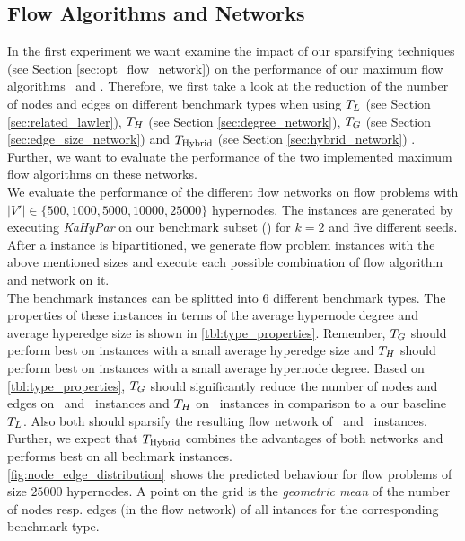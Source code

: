 \subsection{Flow Algorithms and Networks}
\label{sec:exp_flow_network}

In the first experiment we want examine the impact of our sparsifying techniques (see Section \ref{sec:opt_flow_network})
on the performance of our maximum flow algorithms \GoldbergTarjan~and \EdmondKarp. 
Therefore, we first take a look at the reduction of the number of nodes and edges on different benchmark types
when using $T_L$ (see Section \ref{sec:related_lawler}), $T_H$ (see Section 
\ref{sec:degree_network}), $T_G$ (see Section \ref{sec:edge_size_network})
and $T_{\text{Hybrid}}$ (see Section \ref{sec:hybrid_network}) . Further, we
want to evaluate the performance of the two implemented maximum flow algorithms on these
networks. \\
We evaluate the performance of the different flow networks on flow problems with
$|V'| \in \{500,1000,5000,10000,25000\}$ hypernodes. The instances are generated by executing
\emph{KaHyPar} on our benchmark subset () for $k = 2$ and five different 
seeds. After a instance is bipartitioned, we generate flow problem instances
with the above mentioned sizes and execute each possible combination of flow algorithm and
network on it. \\
The benchmark instances can be splitted into $6$ different benchmark types. The properties of these instances
in terms of the average hypernode degree and average hyperedge size is shown in \autoref{tbl:type_properties}.
Remember, $T_G$ should perform best on instances with a small average hyperedge size and
$T_H$ should perform best on instances with a small average hypernode degree. Based on 
\autoref{tbl:type_properties}, $T_G$ should significantly reduce the number of
nodes and edges on \Primal~and \Literal~instances and $T_H$ on \Dual~instances in
comparison to a our baseline $T_L$. Also both should sparsify the resulting flow network
of \ISPD~and \DAC~instances. Further, we expect that $T_{\text{Hybrid}}$ combines the advantages of
both networks and performs best on all bechmark instances.\\
\autoref{fig:node_edge_distribution}~shows the predicted behaviour for flow problems of size
$25000$ hypernodes. A point on the grid is the \emph{geometric mean} of the number of 
nodes resp. edges (in the flow network) of all intances for the corresponding benchmark type.
